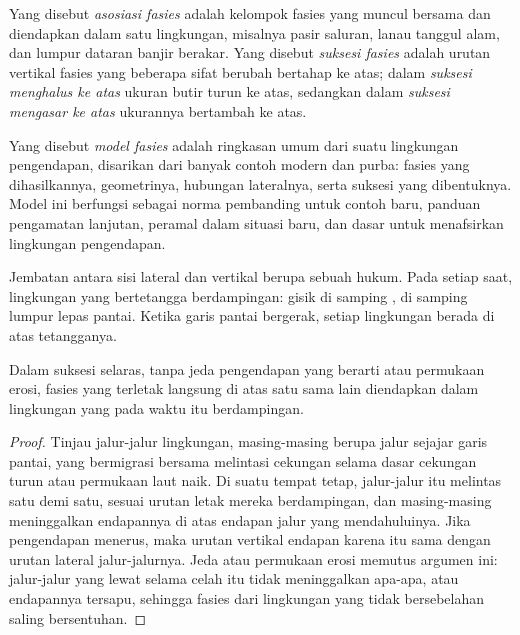 \begin{definition}\label{def:b3:facies-models:association}
Yang disebut \emph{asosiasi fasies} adalah kelompok fasies
yang muncul bersama dan diendapkan dalam satu lingkungan, misalnya pasir saluran,
lanau tanggul alam, dan lumpur dataran banjir berakar. Yang disebut \emph{suksesi
fasies} adalah urutan vertikal fasies yang
beberapa sifat berubah bertahap ke atas; dalam \emph{suksesi menghalus
ke atas} ukuran butir turun ke atas,
sedangkan dalam \emph{suksesi mengasar ke atas}
ukurannya bertambah ke atas.
\end{definition}

\begin{definition}\label{def:b3:facies-models:model}
Yang disebut \emph{model fasies} adalah ringkasan umum dari suatu
lingkungan pengendapan, disarikan dari banyak contoh modern dan purba: fasies
yang dihasilkannya, geometrinya, hubungan lateralnya, serta
suksesi yang dibentuknya. Model ini berfungsi sebagai norma pembanding untuk
contoh baru, panduan pengamatan lanjutan, peramal dalam situasi baru, dan dasar
untuk menafsirkan lingkungan pengendapan.
\end{definition}

Jembatan antara sisi lateral dan vertikal berupa sebuah hukum. Pada setiap saat,
lingkungan yang bertetangga berdampingan: gisik di samping ,
 di samping lumpur lepas pantai. Ketika garis pantai bergerak,
setiap lingkungan berada di atas tetangganya.

\begin{theorem}\label{thm:b3:facies-models:walther}
Dalam suksesi selaras, tanpa jeda pengendapan yang berarti atau
permukaan erosi, fasies yang terletak langsung di atas satu sama lain diendapkan
dalam lingkungan yang pada waktu itu berdampingan.
\end{theorem}

\begin{proof}
Tinjau jalur-jalur lingkungan, masing-masing berupa jalur sejajar garis pantai, yang
bermigrasi bersama melintasi cekungan selama dasar cekungan turun atau permukaan
laut naik. Di suatu tempat tetap, jalur-jalur itu melintas satu demi satu, sesuai urutan
letak mereka berdampingan, dan masing-masing meninggalkan endapannya di atas
endapan jalur yang mendahuluinya. Jika pengendapan menerus, maka urutan
vertikal endapan karena itu sama dengan urutan lateral jalur-jalurnya.
Jeda atau permukaan erosi memutus argumen ini: jalur-jalur yang lewat
selama celah itu tidak meninggalkan apa-apa, atau endapannya tersapu, sehingga fasies dari
lingkungan yang tidak bersebelahan saling bersentuhan.
\end{proof}

